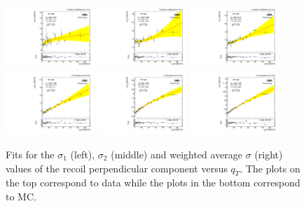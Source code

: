 \begin{figure} [h!]
 \begin{center}
  \includegraphics[width=0.3\textwidth]{Figures/WBoson/Analysis/Correction/Recoil/RecoilFitsqT/Data/fitPFu2sigma1.pdf}
  \includegraphics[width=0.3\textwidth]{Figures/WBoson/Analysis/Correction/Recoil/RecoilFitsqT/Data/fitPFu2sigma2.pdf}
  \includegraphics[width=0.3\textwidth]{Figures/WBoson/Analysis/Correction/Recoil/RecoilFitsqT/Data/fitPFu2sigma.pdf} \\
  \includegraphics[width=0.3\textwidth]{Figures/WBoson/Analysis/Correction/Recoil/RecoilFitsqT/MC/fitPFu2sigma1.pdf}
  \includegraphics[width=0.3\textwidth]{Figures/WBoson/Analysis/Correction/Recoil/RecoilFitsqT/MC/fitPFu2sigma2.pdf}
  \includegraphics[width=0.3\textwidth]{Figures/WBoson/Analysis/Correction/Recoil/RecoilFitsqT/MC/fitPFu2sigma.pdf}
 \caption{Fits for the $\sigma_{1}$ (left), $\sigma_{2}$ (middle) and weighted average $\sigma$ (right) values of the recoil perpendicular component versus $q_{T}$. The plots on the top correspond to data while the plots in the bottom correspond to \ZToMuMu MC.}
 \label{fig:figU2RecoilResolutionFit}
 \end{center}
\end{figure}


